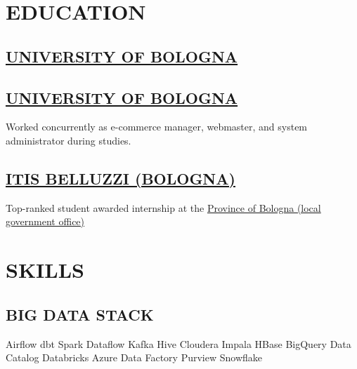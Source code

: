 \documentclass[]{deedy-resume-reversed}
\begin{document}
\hfill
\begin{minipage}[t]{0.35\textwidth}

\section{EDUCATION}

\subsection{\href{https://www.unibo.it/}{UNIVERSITY OF BOLOGNA}}

\sectionsep
\subsection{\href{https://www.unibo.it/}{UNIVERSITY OF BOLOGNA}}
Worked concurrently as e-commerce manager, webmaster, and system administrator during studies.

\sectionsep
\subsection{\href{https://www.belluzzifioravanti.it/}{ITIS BELLUZZI (BOLOGNA)}}
Top-ranked student awarded internship at the \href{https://www.cittametropolitana.bo.it/}{Province of Bologna (local government office)}

\section{SKILLS}

\subsection{BIG DATA STACK}
Airflow \textbullet{} dbt \textbullet{} Spark \textbullet{} Dataflow \textbullet{} Kafka \textbullet{} Hive \textbullet{} Cloudera Impala \textbullet{} HBase \textbullet{} BigQuery \textbullet{} Data Catalog \textbullet{} Databricks \textbullet{} Azure Data Factory \textbullet{} Purview \textbullet{} Snowflake


\end{minipage}
\end{document}
